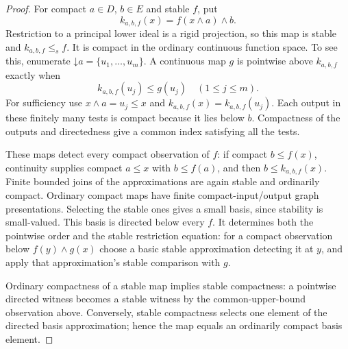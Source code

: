 \documentclass[11pt]{article}
\begin{document}
\begin{proof}
For compact $a\in D$, $b\in E$ and stable $f$, put
\[
 k_{a,b,f}(x)=f(x\wedge a)\wedge b.
\]
Restriction to a principal lower ideal is a rigid projection, so this
map is stable and $k_{a,b,f}\le_s f$. It is compact in the ordinary
continuous function space. To see this, enumerate
$\mathord\downarrow a=\{u_1,\ldots,u_m\}$. A continuous map $g$ is
pointwise above $k_{a,b,f}$ exactly when
\[
 k_{a,b,f}(u_j)\le g(u_j)\quad(1\le j\le m).
\]
For sufficiency use $x\wedge a=u_j\le x$ and
$k_{a,b,f}(x)=k_{a,b,f}(u_j)$. Each output in these finitely many tests
is compact because it lies below $b$. Compactness of the outputs and
directedness give a common index satisfying all the tests.

These maps detect every compact observation of $f$: if compact
$b\le f(x)$, continuity supplies compact $a\le x$ with $b\le f(a)$,
and then $b\le k_{a,b,f}(x)$. Finite bounded joins of the approximations
are again stable and ordinarily compact. Ordinary compact maps have
finite compact-input/output graph presentations. Selecting the stable
ones gives a small basis, since stability is small-valued. This basis
is directed below every $f$. It determines both the pointwise order
and the stable restriction equation: for a compact observation below
$f(y)\wedge g(x)$ choose a basic stable approximation detecting it at
$y$, and apply that approximation's stable comparison with $g$.

Ordinary compactness of a stable map implies stable compactness: a
pointwise directed witness becomes a stable witness by the common-upper-bound
observation above. Conversely, stable compactness selects one element
of the directed basis approximation; hence the map equals an ordinarily
compact basis element.
\end{proof}
\end{document}
